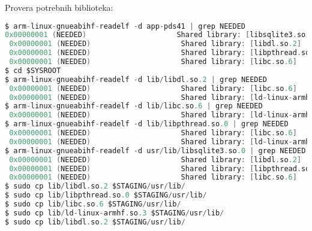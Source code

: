 \documentclass[12pt, a4paper]{article}
\begin{document}
Provera potrebnih biblioteka:
\begin{lstlisting}[language=C]
$ arm-linux-gnueabihf-readelf -d app-pds41 | grep NEEDED
0x00000001 (NEEDED)                     Shared library: [libsqlite3.so.0]
 0x00000001 (NEEDED)                     Shared library: [libdl.so.2]
 0x00000001 (NEEDED)                     Shared library: [libpthread.so.0]
 0x00000001 (NEEDED)                     Shared library: [libc.so.6]
$ cd $SYSROOT
$ arm-linux-gnueabihf-readelf -d lib/libdl.so.2 | grep NEEDED
 0x00000001 (NEEDED)                     Shared library: [libc.so.6]
 0x00000001 (NEEDED)                     Shared library: [ld-linux-armhf.so.3]
$ arm-linux-gnueabihf-readelf -d lib/libc.so.6 | grep NEEDED
 0x00000001 (NEEDED)                     Shared library: [ld-linux-armhf.so.3]
$ arm-linux-gnueabihf-readelf -d lib/libpthread.so.0 | grep NEEDED
 0x00000001 (NEEDED)                     Shared library: [libc.so.6]
 0x00000001 (NEEDED)                     Shared library: [ld-linux-armhf.so.3]
$ arm-linux-gnueabihf-readelf -d usr/lib/libsqlite3.so.0 | grep NEEDED
 0x00000001 (NEEDED)                     Shared library: [libdl.so.2]
 0x00000001 (NEEDED)                     Shared library: [libpthread.so.0]
 0x00000001 (NEEDED)                     Shared library: [libc.so.6]
$ sudo cp lib/libdl.so.2 $STAGING/usr/lib/
$ sudo cp lib/libpthread.so.0 $STAGING/usr/lib/
$ sudo cp lib/libc.so.6 $STAGING/usr/lib/
$ sudo cp lib/ld-linux-armhf.so.3 $STAGING/usr/lib/
$ sudo cp lib/libdl.so.2 $STAGING/usr/lib/
\end{lstlisting}
\end{document}
